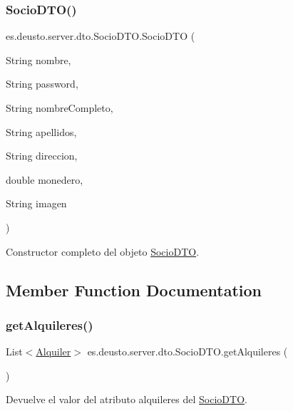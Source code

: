 \subsubsection{\texorpdfstring{SocioDTO()}{SocioDTO()}}
{\footnotesize\ttfamily es.\+deusto.\+server.\+dto.\+Socio\+D\+T\+O.\+Socio\+D\+TO (\begin{DoxyParamCaption}\item[{String}]{nombre,  }\item[{String}]{password,  }\item[{String}]{nombre\+Completo,  }\item[{String}]{apellidos,  }\item[{String}]{direccion,  }\item[{double}]{monedero,  }\item[{String}]{imagen }\end{DoxyParamCaption})}

Constructor completo del objeto \mbox{\hyperlink{classes_1_1deusto_1_1server_1_1dto_1_1_socio_d_t_o}{Socio\+D\+TO}}. 

\subsection{Member Function Documentation}
\mbox{\label{classes_1_1deusto_1_1server_1_1dto_1_1_socio_d_t_o_aef5faa0df13d41fb8e900ea22e3d204f}} 
\subsubsection{\texorpdfstring{getAlquileres()}{getAlquileres()}}
{\footnotesize\ttfamily List$<$\mbox{\hyperlink{classes_1_1deusto_1_1client_1_1data_1_1_alquiler}{Alquiler}}$>$ es.\+deusto.\+server.\+dto.\+Socio\+D\+T\+O.\+get\+Alquileres (\begin{DoxyParamCaption}{ }\end{DoxyParamCaption})}

Devuelve el valor del atributo alquileres del \mbox{\hyperlink{classes_1_1deusto_1_1server_1_1dto_1_1_socio_d_t_o}{Socio\+D\+TO}}. \mbox{\label{classes_1_1deusto_1_1server_1_1dto_1_1_socio_d_t_o_aa5539e179d8333ac5c239c2e6c86a9df}} 
